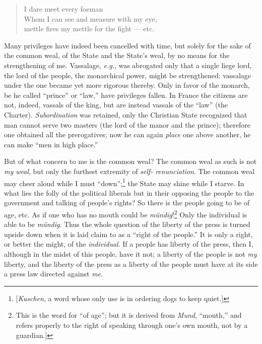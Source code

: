 \begin{quotation}

\noindent{} I dare meet every foeman\\
 Whom I can see and measure with my eye,\\
 mettle fires my mettle for the fight --- etc. \end{quotation}

\noindent{}Many privileges have indeed been cancelled with time, but solely 
for the sake of the common weal, of the State and the State's weal, by no 
means for the strengthening of me. Vassalage, \textit{e.g.}, was abrogated 
only that a single liege lord, the lord of the people, the monarchical power, 
might be strengthened: vassalage under the one became yet more rigorous 
thereby. Only in favor of the monarch, be he called ``prince'' or ``law,'' 
have privileges fallen. In France the citizens are not, indeed, vassals of the 
king, but are instead vassals of the ``law'' (the Charter). 
\textit{Subordination} was retained, only the Christian State recognized that 
man cannot serve two masters (the lord of the manor and the prince); therefore 
one obtained all the prerogatives; now he can again \textit{place} one above 
another, he can make ``men in high place.''

But of what concern to me is the common weal? The common weal as such is not 
\textit{my weal}, but only the furthest extremity of \textit{self- 
renunciation}. The common weal may cheer aloud while I must 
``down'';\footnote{[\textit{Kuschen}, a word whose only use is in ordering 
dogs to keep quiet.]} the State may shine while I starve. In what lies the 
folly of the political liberals but in their opposing the people to the 
government and talking of people's rights? So there is the people going to be 
of age, etc. As if one who has no mouth could be 
\textit{m\"undig}!\footnote{This is the word for ``of age''; but it is 
derived from \textit{Mund}, ``mouth,'' and refers properly to the right of 
speaking through one's own mouth, not by a guardian.]} Only the individual is 
able to be \textit{m\"undig}. Thus the whole question of the liberty of the 
press is turned upside down when it is laid claim to as a ``right of the 
people.'' It is only a right, or better the might, of the 
\textit{individual}. If a people has liberty of the press, then I, although in 
the midst of this people, have it not; a liberty of the people is not 
\textit{my} liberty, and the liberty of the press as a liberty of the people 
must have at its side a press law directed against \textit{me}.

